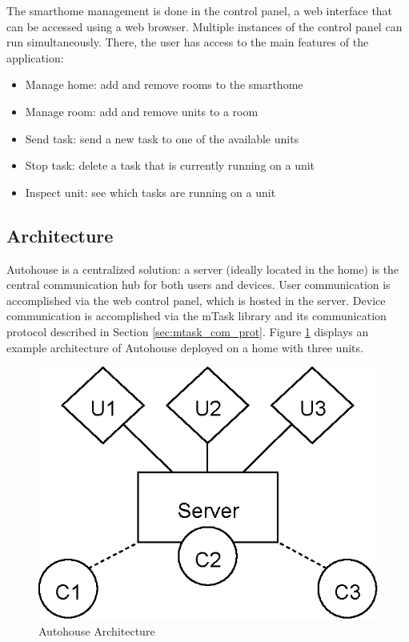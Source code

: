 The smarthome management is done in the control panel, a web interface that can be accessed using a web browser. Multiple instances of the control panel can run simultaneously. There, the user has access to the main features of the application:

\begin{itemize}
    \item Manage home: add and remove rooms to the smarthome
    \item Manage room: add and remove units to a room
    \item Send task: send a new task to one of the available units
    \item Stop task: delete a task that is currently running on a unit
    \item Inspect unit: see which tasks are running on a unit
\end{itemize}

\subsection{Architecture}

Autohouse is a centralized solution: a server (ideally located in the home) is the central communication hub for both users and devices. User communication is accomplished via the web control panel, which is hosted in the server. Device communication is accomplished via the \gls{mTask} library and its communication protocol described in Section \ref{sec:mtask_com_prot}. Figure \ref{fig:autohouse_arch} displays an example architecture of Autohouse deployed on a home with three units. 

\begin{figure}[H]
\begin{center}
\includegraphics[scale=1.0]{thesis/img/autohouse_arch.eps}
\end{center}
\caption{Autohouse Architecture}
\label{fig:autohouse_arch}
\end{figure}

